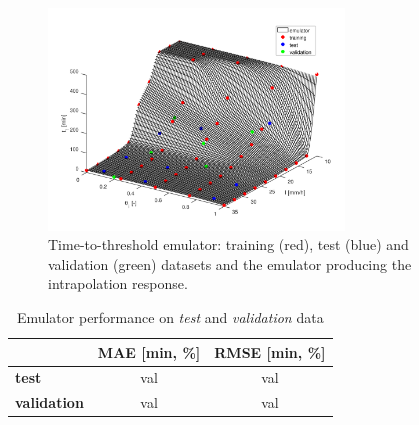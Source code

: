 \begin{figure}[htpb]
  \centering
  \includegraphics[width=0.7\textwidth]{Figures/emulator.png}
  \caption{Time-to-threshold emulator: training (red), test (blue) and validation (green) datasets and the emulator producing the intrapolation response.}
  \label{fig:regression_emulator}
\end{figure}


\begin{table}[htpb]
  \centering
  \caption{Emulator performance on \emph{test} and \emph{validation} data}
  \label{table label}
  \begin{tabular}{lcc}
    \toprule
     & \textbf{MAE [\si{\minute}, \si{\percent}]} & \textbf{RMSE [\si{\minute}, \si{\percent}]} \\
    \midrule
    \textbf{test} & val & val \\
    \textbf{validation} & val & val \\
    \bottomrule
  \end{tabular}
\end{table}

